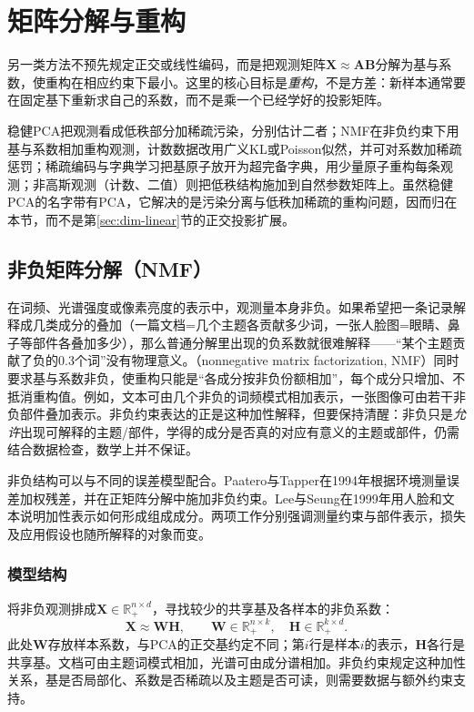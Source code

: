 \section{矩阵分解与重构}
\label{sec:dim-matrix-factorization}

另一类方法不预先规定正交或线性编码，而是把观测矩阵$\bm{X}\approx\bm{A}\bm{B}$分解为基与系数，使重构在相应约束下最小。这里的核心目标是\emph{重构}，不是方差：新样本通常要在固定基下重新求自己的系数，而不是乘一个已经学好的投影矩阵。

稳健PCA把观测看成低秩部分加稀疏污染，分别估计二者；NMF在非负约束下用基与系数相加重构观测，计数数据改用广义KL或Poisson似然，并可对系数加稀疏惩罚；稀疏编码与字典学习把基原子放开为超完备字典，用少量原子重构每条观测；非高斯观测（计数、二值）则把低秩结构施加到自然参数矩阵上。虽然稳健PCA的名字带有PCA，它解决的是污染分离与低秩加稀疏的重构问题，因而归在本节，而不是第\ref{sec:dim-linear}节的正交投影扩展。

\subsection{非负矩阵分解（NMF）}
\label{sec:dim-nmf}

在词频、光谱强度或像素亮度的表示中，观测量本身非负。如果希望把一条记录解释成几类成分的叠加（一篇文档=几个主题各贡献多少词，一张人脸图=眼睛、鼻子等部件各叠加多少），那么普通分解里出现的负系数就很难解释——“某个主题贡献了负的0.3个词”没有物理意义。（nonnegative matrix factorization, NMF）同时要求基与系数非负，使重构只能是“各成分按非负份额相加”，每个成分只增加、不抵消重构值。例如，文本可由几个非负的词频模式相加表示，一张图像可由若干非负部件叠加表示。非负约束表达的正是这种加性解释，但要保持清醒：非负只是\emph{允许}出现可解释的主题/部件，学得的成分是否真的对应有意义的主题或部件，仍需结合数据检查，数学上并不保证。

非负结构可以与不同的误差模型配合。Paatero与Tapper在1994年根据环境测量误差加权残差，并在正矩阵分解中施加非负约束。Lee与Seung在1999年用人脸和文本说明加性表示如何形成组成成分。两项工作分别强调测量约束与部件表示，损失及应用假设也随所解释的对象而变。

\subsubsection{模型结构}
\label{sec:dim-nmf-structure}

将非负观测排成$\bm{X}\in\mathbb{R}_{+}^{n\times d}$，寻找较少的共享基及各样本的非负系数：
\begin{equation}
  \bm{X}\approx\bm{W}\bm{H},\qquad
  \bm{W}\in\mathbb{R}_{+}^{n\times k},\quad
  \bm{H}\in\mathbb{R}_{+}^{k\times d}.
  \label{eq:dim-nmf-factorization}
\end{equation}
此处$\bm{W}$存放样本系数，与PCA的正交基约定不同；第$i$行是样本$i$的表示，$\bm{H}$各行是共享基。文档可由主题词模式相加，光谱可由成分谱相加。非负约束规定这种加性关系，基是否局部化、系数是否稀疏以及主题是否可读，则需要数据与额外约束支持。

